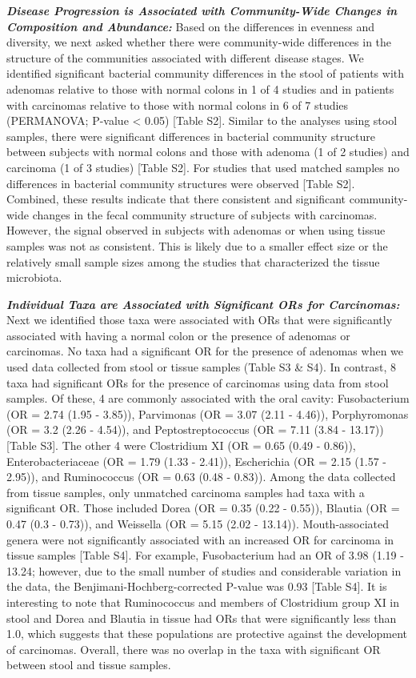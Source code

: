 \documentclass[12pt,]{article}
\begin{document}
\textbf{\emph{Disease Progression is Associated with Community-Wide
Changes in Composition and Abundance:}} Based on the differences in
evenness and diversity, we next asked whether there were community-wide
differences in the structure of the communities associated with
different disease stages. We identified significant bacterial community
differences in the stool of patients with adenomas relative to those
with normal colons in 1 of 4 studies and in patients with carcinomas
relative to those with normal colons in 6 of 7 studies (PERMANOVA;
P-value \textless{} 0.05) {[}Table S2{]}. Similar to the analyses using
stool samples, there were significant differences in bacterial community
structure between subjects with normal colons and those with adenoma (1
of 2 studies) and carcinoma (1 of 3 studies) {[}Table S2{]}. For studies
that used matched samples no differences in bacterial community
structures were observed {[}Table S2{]}. Combined, these results
indicate that there consistent and significant community-wide changes in
the fecal community structure of subjects with carcinomas. However, the
signal observed in subjects with adenomas or when using tissue samples
was not as consistent. This is likely due to a smaller effect size or
the relatively small sample sizes among the studies that characterized
the tissue microbiota.

\textbf{\emph{Individual Taxa are Associated with Significant ORs for
Carcinomas:}} Next we identified those taxa were associated with ORs
that were significantly associated with having a normal colon or the
presence of adenomas or carcinomas. No taxa had a significant OR for the
presence of adenomas when we used data collected from stool or tissue
samples (Table S3 \& S4). In contrast, 8 taxa had significant ORs for
the presence of carcinomas using data from stool samples. Of these, 4
are commonly associated with the oral cavity: Fusobacterium (OR = 2.74
(1.95 - 3.85)), Parvimonas (OR = 3.07 (2.11 - 4.46)), Porphyromonas (OR
= 3.2 (2.26 - 4.54)), and Peptostreptococcus (OR = 7.11 (3.84 - 13.17))
{[}Table S3{]}. The other 4 were Clostridium XI (OR = 0.65 (0.49 -
0.86)), Enterobacteriaceae (OR = 1.79 (1.33 - 2.41)), Escherichia (OR =
2.15 (1.57 - 2.95)), and Ruminococcus (OR = 0.63 (0.48 - 0.83)). Among
the data collected from tissue samples, only unmatched carcinoma samples
had taxa with a significant OR. Those included Dorea (OR = 0.35 (0.22 -
0.55)), Blautia (OR = 0.47 (0.3 - 0.73)), and Weissella (OR = 5.15 (2.02
- 13.14)). Mouth-associated genera were not significantly associated
with an increased OR for carcinoma in tissue samples {[}Table S4{]}. For
example, Fusobacterium had an OR of 3.98 (1.19 - 13.24; however, due to
the small number of studies and considerable variation in the data, the
Benjimani-Hochberg-corrected P-value was 0.93 {[}Table S4{]}. It is
interesting to note that Ruminococcus and members of Clostridium group
XI in stool and Dorea and Blautia in tissue had ORs that were
significantly less than 1.0, which suggests that these populations are
protective against the development of carcinomas. Overall, there was no
overlap in the taxa with significant OR between stool and tissue
samples.
\end{document}
